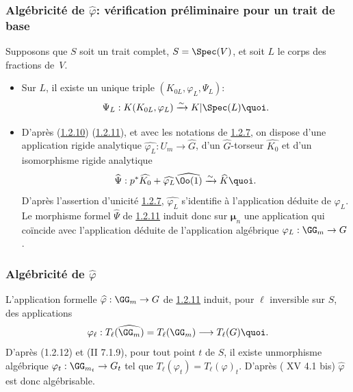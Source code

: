 \subsubsection{Algébricité de $\widehat{\varphi}$: vérification
  préliminaire pour un trait de base}

Supposons que $S$ soit un trait complet, $S=\Spec(V)$, et soit $L$ le
corps des fractions de~$V$.
\begin{itemize}
\item[a)] Sur $L$, il existe un unique triple
  $(K_{0L},\varphi_{L},\Psi_{L})$:
$$
\Psi_{L}:K(K_{0L},\varphi_{L})\xrightarrow{\sim} K|\Spec (L){\quoi}.
$$

\item[b)] D'après (\hyperref[XVIII.subsubsec1.2.10]{1.2.10}) (\hyperref[XVIII.subsubsec1.2.11]{1.2.11}),
et avec les notations de \hyperref[XVIII.subsubsec1.2.7]{1.2.7},
  on dispose d'une application rigide analytique
  $\widehat{\varphi_{L}}:U_{m}\rightarrow \widehat{G}$, d'un
  $\widehat{G}$-torseur $\widehat{K_{0}}$ et d'un
  isomorphisme rigide analytique
$$
\widehat{\Psi}:p^{\ast}\widehat{K_0}+\widehat{\varphi_{L}}
\widehat{\Oo(1)}\xrightarrow{\sim}
\widehat{K}{\quoi}.
$$
D'après l'assertion d'unicité \hyperref[XVIII.subsubsec1.2.7]{1.2.7},
$\widehat{\varphi_{L}}$ 
s'identifie à l'application déduite de $\varphi_{L}$. Le morphisme
formel $\widehat{\Psi}$ de \hyperref[XVIII.subsubsec1.2.11]{1.2.11} induit donc sur
$𝛍_{n}$ une application qui 
coïncide avec l'application déduite de l'application algébrique
$\varphi_{L}:\GG_{m}\rightarrow G$.
\end{itemize}

\subsubsection{Algébricité de $\widehat{\varphi}$}

L'application formelle $\widehat{\varphi}:\GG_{m}\rightarrow G$
de \hyperref[XVIII.subsubsec1.2.11]{1.2.11} induit, pour $\ell$ inversible sur $S$,
des applications 
$$
\varphi_{\ell}:T_{\ell}(\widehat{\GG_{m}})=T_{\ell}(\GG_{m})\longrightarrow
T_{\ell}(G){\quoi}.
$$
D'après (1.2.12) et (\EGA II 7.1.9), pour tout point $t$ de $S$, il
existe un\pageoriginale  morphisme algébrique
$\varphi_{t}:\GG_{m_{t}}\rightarrow G_{t}$ tel que
$T_{\ell}(\varphi_{t})=T_{\ell}(\varphi)_{t}$. D'après ( XV 4.1
  bis) $\widehat{\varphi}$ est donc algébrisable.


